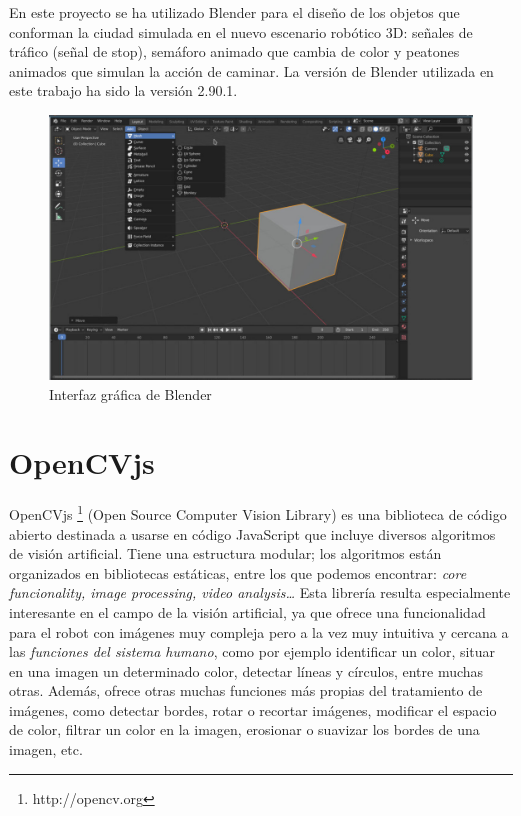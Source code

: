 \documentclass{report}
\begin{document}
En este proyecto se ha utilizado Blender para el diseño de los objetos que conforman la ciudad simulada en el nuevo escenario robótico 3D: señales de tráfico (señal de stop), semáforo animado que cambia de color y peatones animados que simulan la acción de caminar. La versión de Blender utilizada en este trabajo ha sido la versión 2.90.1.

\renewcommand{\figurename}{Figura}		
\begin{figure}[h]
	\centering
	 \includegraphics[scale=1]{images/blender.jpg}
	 \caption{Interfaz gráfica de Blender}
\end{figure}

\section{OpenCVjs}
OpenCVjs \footnote{http://opencv.org} \cite{OpenCVjs} (Open Source Computer Vision Library) es una biblioteca de código abierto destinada a usarse en código JavaScript que incluye diversos algoritmos de visión artificial. Tiene una estructura modular; los algoritmos están organizados en bibliotecas estáticas, entre los que podemos encontrar: \textit{core funcionality, image processing, video analysis…} Esta librería resulta especialmente interesante en el campo de la visión artificial, ya que ofrece una funcionalidad para el robot con imágenes muy compleja pero a la vez muy intuitiva y cercana a las \textit{funciones del sistema humano}, como por ejemplo identificar un color, situar en una imagen un determinado color, detectar líneas y círculos, entre muchas otras. Además, ofrece  otras muchas funciones más propias del tratamiento de imágenes, como detectar bordes, rotar o recortar imágenes, modificar el espacio de color, filtrar un color en la imagen, erosionar o suavizar los bordes de una imagen, etc.
\\
\end{document}
